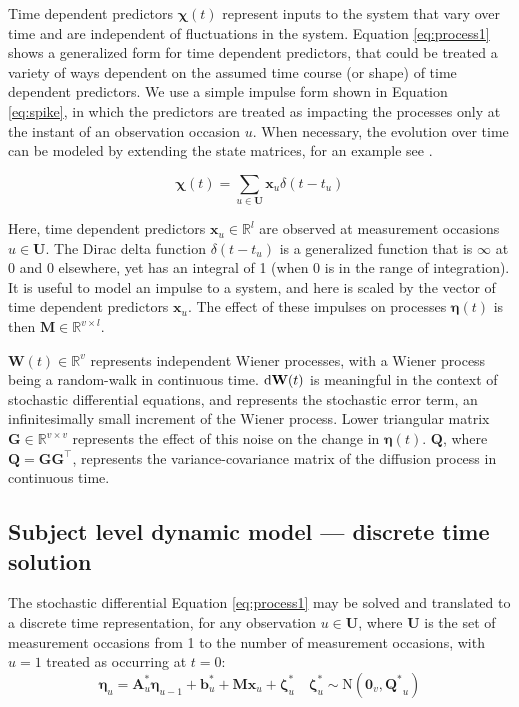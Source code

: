 \documentclass[nojss]{jss}\usepackage[]{graphicx}\usepackage[]{color}
\newcommand{\vect}[1]{\boldsymbol{\mathbf{#1}}}
\begin{document}
Time dependent predictors $\vect{\chi}(t)$ represent inputs to the system that vary over time and are independent of fluctuations in the system. Equation \ref{eq:process1} shows a generalized form for time dependent predictors, that could be treated a variety of ways dependent on the assumed time course (or shape) of time dependent predictors. We use a simple impulse form shown in Equation \ref{eq:spike}, in which the predictors are treated as impacting the processes only at the instant of an observation occasion $u$. When necessary, the evolution over time can be modeled by extending the state matrices, for an example see \citet{driverinpresscontinuous}.

\begin{equation}
\label{eq:spike}
\vect{\chi} (t) = \sum_{ u \in \vect{U}}  \vect{x}_{u} \delta (t-t_u)     
\end{equation}

Here, time dependent predictors $\vect{x}_u \in \mathbb{R}^{l}$ are observed at measurement occasions $ u \in \vect{U}$. The Dirac delta function $\delta(t-t_u)$ is a generalized function that is $\infty$ at 0 and 0 elsewhere, yet has an integral of 1 (when 0 is in the range of integration). It is useful to model an impulse to a system, and here is scaled by the vector of time dependent predictors $\vect{x}_u$.  The effect of these impulses on processes $\vect{\eta}(t)$ is then $\vect{M}\in \mathbb{R}^{v \times l}$. 

$\vect{W}(t) \in \mathbb{R}^{v}$ represents independent Wiener processes, with a Wiener process being a random-walk in continuous time. $\textnormal{d}\vect{W}(t)$ is meaningful in the context of stochastic differential equations, and represents the stochastic error term, an infinitesimally small increment of the Wiener process. Lower triangular matrix $\vect{G} \in \mathbb{R}^{v \times v}$ represents the effect of this noise on the change in  $\vect{\eta}(t)$.  $\vect{Q}$, where $\vect{Q} = \vect{GG}^\top$, represents the variance-covariance matrix of the diffusion process in continuous time.

\subsection{Subject level dynamic model --- discrete time solution}
The stochastic differential Equation \ref{eq:process1} may be solved and translated to a discrete time representation, for any observation $u \in \vect{U}$, where $\vect{U}$ is the set of measurement occasions from 1 to the number of measurement occasions, with $u = 1$ treated as occurring at $t = 0$:
\begin{equation}
	\label{eq:discreteprocess}
	\vect{\eta}_{u} =
	\vect{A}^*_u \vect{\eta}_{u-1} +
	\vect{b}^*_u +
	\vect{M} \vect{x}_u +
	\vect{\zeta}^*_u \quad \vect{\zeta}^*_u \sim \mathrm{N}(\vect{0}_v, \vect{Q^*}_u)
\end{equation}
\end{document}

